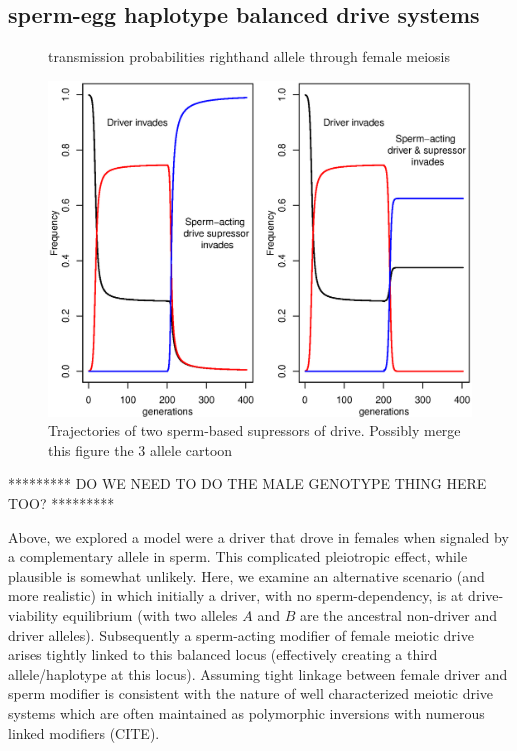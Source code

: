 \documentclass[12pt,letterpaper]{article}
\newcommand{\yb}[1]{{ \color{blue} #1}}
\begin{document}
\subsection*{ sperm-egg haplotype balanced drive systems}

\begin{figure}
\caption{transmission probabilities righthand allele through female
  meiosis}  \label{Eggsperm_3_allele_cartoon}
\end{figure}


\begin{figure}
\includegraphics[width = 0.8 \textwidth]{Figures/trajectories_of_sperm_based_supressors.eps} 
\caption{Trajectories of two sperm-based supressors of drive. Possibly
merge this figure the 3 allele cartoon}  \label{Trajectories_of_supressors}
\end{figure}

\yb{********* DO WE NEED TO DO THE MALE GENOTYPE THING HERE TOO? *********}

Above, we explored a model were a driver that drove in females when signaled by a complementary allele in sperm.  
This complicated pleiotropic effect, while plausible is somewhat unlikely. 
Here, we examine an alternative scenario (and more realistic) in which
initially a driver, with no sperm-dependency, is at drive-viability equilibrium (with two alleles
$A$ and $B$ are the ancestral non-driver and driver alleles).
Subsequently a sperm-acting modifier of female meiotic drive arises tightly
        linked to this balanced locus (effectively creating a third
        allele/haplotype at this locus).
Assuming tight linkage between female driver and sperm modifier is consistent with the nature of well characterized meiotic drive systems 
	which are often maintained as polymorphic inversions with numerous linked modifiers (CITE).
\end{document}
